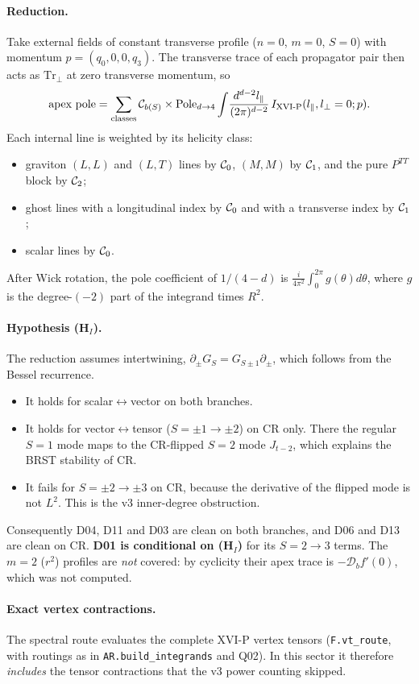 \paragraph{Reduction.} Take external fields of constant transverse profile ($n=0$, $m=0$, $S=0$) with momentum $p=(q_0,0,0,q_3)$. The transverse trace of each propagator pair then acts as $\mathrm{Tr}_\perp$ at zero transverse momentum, so
\[ \text{apex pole}=\sum_{\text{classes}}\mathcal C_{b(S)}\times\mathrm{Pole}_{d\to4}\int\!\frac{d^{d-2}l_\parallel}{(2\pi)^{d-2}}\,I_{\rm XVI\text{-}P}(l_\parallel,l_\perp=0;p). \]
Each internal line is weighted by its helicity class:
\begin{itemize}
\item graviton $(L,L)$ and $(L,T)$ lines by $\mathcal C_0$, $(M,M)$ by $\mathcal C_1$, and the pure $P^{TT}$ block by $\mathcal C_2$;
\item ghost lines with a longitudinal index by $\mathcal C_0$ and with a transverse index by $\mathcal C_1$;
\item scalar lines by $\mathcal C_0$.
\end{itemize}
After Wick rotation, the pole coefficient of $1/(4-d)$ is $\frac{i}{4\pi^2}\int_0^{2\pi}g(\theta)d\theta$, where $g$ is the degree-$(-2)$ part of the integrand times $R^2$.

\paragraph{Hypothesis (H$_I$).} The reduction assumes intertwining, $\partial_\pm G_S=G_{S\pm1}\partial_\pm$, which follows from the Bessel recurrence.
\begin{itemize}
\item It holds for scalar$\leftrightarrow$vector on both branches.
\item It holds for vector$\leftrightarrow$tensor ($S=\pm1\to\pm2$) on CR only. There the regular $S=1$ mode maps to the CR-flipped $S=2$ mode $J_{t-2}$, which explains the BRST stability of CR.
\item It fails for $S=\pm2\to\pm3$ on CR, because the derivative of the flipped mode is not $L^2$. This is the v3 inner-degree obstruction.
\end{itemize}
Consequently D04, D11 and D03 are clean on both branches, and D06 and D13 are clean on CR. \textbf{D01 is conditional on (H$_I$)} for its $S=2\to3$ terms. The $m=2$ ($r^2$) profiles are \emph{not} covered: by cyclicity their apex trace is $-\mathcal D_b f'(0)$, which was not computed.

\paragraph{Exact vertex contractions.} The spectral route evaluates the complete XVI-P vertex tensors (\texttt{F.vt\_route}, with routings as in \texttt{AR.build\_integrands} and Q02). In this sector it therefore \emph{includes} the tensor contractions that the v3 power counting skipped.

